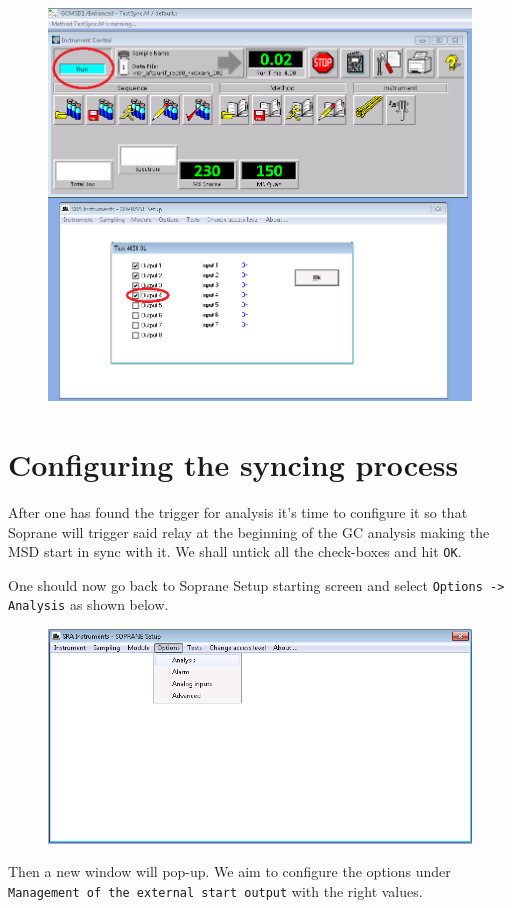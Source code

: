 \documentclass[31pt]{article}
\begin{document}
\begin{figure}[h]
\centering
\includegraphics[width=.6\textwidth]{8FindTrigger.png}
\label{fig:univerise}
\end{figure}
\newpage

\section{Configuring the syncing process}

After one has found the trigger for analysis it's time to configure it so that Soprane will trigger said relay at the beginning of the GC analysis making the MSD start in sync with it. We shall untick all the check-boxes and hit \texttt{OK}.

One should now go back to Soprane Setup starting screen and select \texttt{Options -> Analysis} as shown below.

\begin{figure}[h]
\centering
\includegraphics[width=.9\textwidth]{9SetupAnalysis.png}
\label{fig:univerise}
\end{figure}


Then a new window will pop-up. We aim to configure the options under \texttt{Management of the external start output} with the right values.
\end{document}
